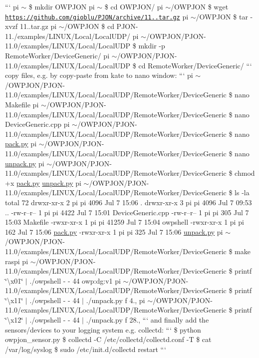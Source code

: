 ``` pi $\sim$ \$ mkdir O\-W\-P\-J\-O\-N pi $\sim$ \$ cd O\-W\-P\-J\-O\-N/ pi $\sim$/\-O\-W\-P\-J\-O\-N \$ wget \href{https://github.com/gioblu/PJON/archive/11.0.tar.gz}{\tt https\-://github.\-com/gioblu/\-P\-J\-O\-N/archive/11..\-tar.\-gz} pi $\sim$/\-O\-W\-P\-J\-O\-N \$ tar -\/xvzf 11..\-tar.\-gz pi $\sim$/\-O\-W\-P\-J\-O\-N \$ cd P\-J\-O\-N-\/11./examples/\-L\-I\-N\-U\-X/\-Local/\-Local\-U\-D\-P/ pi $\sim$/\-O\-W\-P\-J\-O\-N/\-P\-J\-O\-N-\/11.0/examples/\-L\-I\-N\-U\-X/\-Local/\-Local\-U\-D\-P \$ mkdir -\/p Remote\-Worker/\-Device\-Generic/ pi $\sim$/\-O\-W\-P\-J\-O\-N/\-P\-J\-O\-N-\/11.0/examples/\-L\-I\-N\-U\-X/\-Local/\-Local\-U\-D\-P \$ cd Remote\-Worker/\-Device\-Generic/ ``` copy files, e.\-g. by copy-\/paste from kate to nano window\-: ``` pi $\sim$/\-O\-W\-P\-J\-O\-N/\-P\-J\-O\-N-\/11.0/examples/\-L\-I\-N\-U\-X/\-Local/\-Local\-U\-D\-P/\-Remote\-Worker/\-Device\-Generic \$ nano Makefile pi $\sim$/\-O\-W\-P\-J\-O\-N/\-P\-J\-O\-N-\/11.0/examples/\-L\-I\-N\-U\-X/\-Local/\-Local\-U\-D\-P/\-Remote\-Worker/\-Device\-Generic \$ nano Device\-Generic.\-cpp pi $\sim$/\-O\-W\-P\-J\-O\-N/\-P\-J\-O\-N-\/11.0/examples/\-L\-I\-N\-U\-X/\-Local/\-Local\-U\-D\-P/\-Remote\-Worker/\-Device\-Generic \$ nano \hyperlink{pack_8py}{pack.\-py} pi $\sim$/\-O\-W\-P\-J\-O\-N/\-P\-J\-O\-N-\/11.0/examples/\-L\-I\-N\-U\-X/\-Local/\-Local\-U\-D\-P/\-Remote\-Worker/\-Device\-Generic \$ nano \hyperlink{unpack_8py}{unpack.\-py} pi $\sim$/\-O\-W\-P\-J\-O\-N/\-P\-J\-O\-N-\/11.0/examples/\-L\-I\-N\-U\-X/\-Local/\-Local\-U\-D\-P/\-Remote\-Worker/\-Device\-Generic \$ chmod +x \hyperlink{pack_8py}{pack.\-py} \hyperlink{unpack_8py}{unpack.\-py} pi $\sim$/\-O\-W\-P\-J\-O\-N/\-P\-J\-O\-N-\/11.0/examples/\-L\-I\-N\-U\-X/\-Local/\-Local\-U\-D\-P/\-Remote\-Worker/\-Device\-Generic \$ ls -\/la total 72 drwxr-\/xr-\/x 2 pi pi 4096 Jul 7 15\-:06 . drwxr-\/xr-\/x 3 pi pi 4096 Jul 7 09\-:53 .. -\/rw-\/r--r-- 1 pi pi 4422 Jul 7 15\-:01 Device\-Generic.\-cpp -\/rw-\/r--r-- 1 pi pi 305 Jul 7 15\-:03 Makefile -\/rwxr-\/xr-\/x 1 pi pi 41259 Jul 7 15\-:04 owpshell -\/rwxr-\/xr-\/x 1 pi pi 162 Jul 7 15\-:06 \hyperlink{pack_8py}{pack.\-py} -\/rwxr-\/xr-\/x 1 pi pi 325 Jul 7 15\-:06 \hyperlink{unpack_8py}{unpack.\-py} pi $\sim$/\-O\-W\-P\-J\-O\-N/\-P\-J\-O\-N-\/11.0/examples/\-L\-I\-N\-U\-X/\-Local/\-Local\-U\-D\-P/\-Remote\-Worker/\-Device\-Generic \$ make raspi pi $\sim$/\-O\-W\-P\-J\-O\-N/\-P\-J\-O\-N-\/11.0/examples/\-L\-I\-N\-U\-X/\-Local/\-Local\-U\-D\-P/\-Remote\-Worker/\-Device\-Generic \$ printf \char`\"{}\textbackslash{}x01\char`\"{} $\vert$ ./owpshell -\/ -\/ 44 owp\-:dg\-:v1 pi $\sim$/\-O\-W\-P\-J\-O\-N/\-P\-J\-O\-N-\/11.0/examples/\-L\-I\-N\-U\-X/\-Local/\-Local\-U\-D\-P/\-Remote\-Worker/\-Device\-Generic \$ printf \char`\"{}\textbackslash{}x11\char`\"{} $\vert$ ./owpshell -\/ -\/ 44 $\vert$ ./unpack.py f 4., pi $\sim$/\-O\-W\-P\-J\-O\-N/\-P\-J\-O\-N-\/11.0/examples/\-L\-I\-N\-U\-X/\-Local/\-Local\-U\-D\-P/\-Remote\-Worker/\-Device\-Generic \$ printf \char`\"{}\textbackslash{}x12\char`\"{} $\vert$ ./owpshell -\/ -\/ 44 $\vert$ ./unpack.py f 28., ``` and finally add the sensors/devices to your logging system e.\-g. collectd\-: ``` \$ python owpjon\-\_\-sensor.\-py \$ collectd -\/\-C /etc/collectd/collectd.conf -\/\-T \$ cat /var/log/syslog \$ sudo /etc/init.d/collectd restart ```

